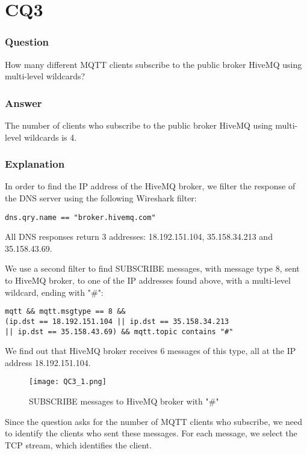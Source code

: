 \section{CQ3}
\subsubsection{Question}
How many different MQTT clients subscribe to the public broker HiveMQ using multi-level wildcards?

\subsubsection{Answer}
The number of clients who subscribe to the public broker HiveMQ using multi-level wildcards is 4.

\subsubsection{Explanation}
In order to find the IP address of the HiveMQ broker, we filter the response of the DNS server using the following Wireshark filter:
\begin{verbatim}
dns.qry.name == "broker.hivemq.com"
\end{verbatim}
All DNS responses return 3 addresses: 18.192.151.104, 35.158.34.213 and 35.158.43.69.

We use a second filter to find SUBSCRIBE messages, with message type 8, sent to HiveMQ broker, to one of the IP addresses found above, with a multi-level wildcard, ending with "\#": 
\begin{verbatim}
mqtt && mqtt.msgtype == 8 && 
(ip.dst == 18.192.151.104 || ip.dst == 35.158.34.213 
|| ip.dst == 35.158.43.69) && mqtt.topic contains "#"
\end{verbatim}
We find out that HiveMQ broker receives 6 messages of this type, all at the IP address 18.192.151.104.

\begin{figure}[H]
    \centering
    \texttt{[image: QC3\_1.png]}
    \caption{SUBSCRIBE messages to HiveMQ broker with "\#"}
\end{figure}

Since the question asks for the number of MQTT clients who subscribe, we need to identify the clients who sent these messages. For each message, we select the TCP stream, which identifies the client.\\

